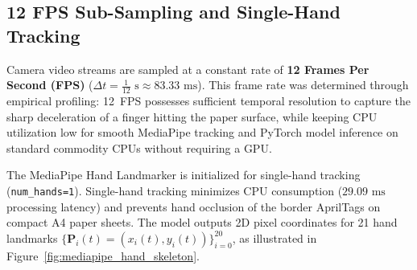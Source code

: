 \subsection{12 FPS Sub-Sampling and Single-Hand Tracking}
\label{subsec:meth_subsampling}
Camera video streams are sampled at a constant rate of \textbf{12 Frames Per Second (FPS)} ($\Delta t = \frac{1}{12}\text{ s} \approx 83.33\text{ ms}$). This frame rate was determined through empirical profiling: 12~FPS possesses sufficient temporal resolution to capture the sharp deceleration of a finger hitting the paper surface, while keeping CPU utilization low for smooth MediaPipe tracking and PyTorch model inference on standard commodity CPUs without requiring a GPU.

The MediaPipe Hand Landmarker is initialized for single-hand tracking (\texttt{num\_hands=1}). Single-hand tracking minimizes CPU consumption ($29.09\text{ ms}$ processing latency) and prevents hand occlusion of the border AprilTags on compact A4 paper sheets. The model outputs 2D pixel coordinates for 21 hand landmarks $\{\mathbf{P}_i(t) = (x_i(t), y_i(t))\}_{i=0}^{20}$, as illustrated in Figure~\ref{fig:mediapipe_hand_skeleton}.

